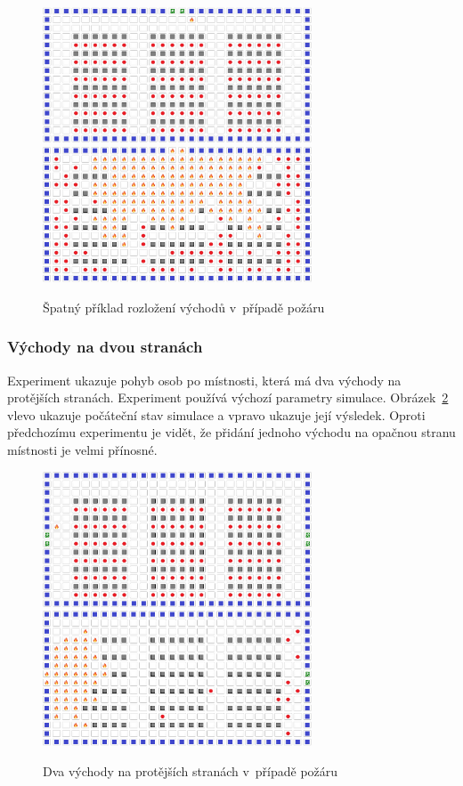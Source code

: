\documentclass[11pt, titlepage, a4paper]{article}
\begin{document}
        \begin{figure}[H]
            \includegraphics[width=8cm]{FireResearch/badFireInit}
            \includegraphics[width=8cm]{FireResearch/badFireEnd}
            \caption{Špatný příklad rozložení východů v~případě požáru}
            \label{badFire}
        \end{figure}

        \subsubsection{Východy na dvou stranách}
        Experiment ukazuje pohyb osob po místnosti, která má dva východy na protějších stranách. Experiment používá výchozí parametry simulace. Obrázek~\ref{goodFire} vlevo ukazuje počáteční stav simulace a vpravo ukazuje její výsledek. Oproti předchozímu experimentu je vidět, že přidání jednoho východu na opačnou stranu místnosti je velmi přínosné.\\

        \begin{figure}[H]
            \includegraphics[width=8cm]{FireResearch/goodFireInit}
            \includegraphics[width=8cm]{FireResearch/goodFireEnd}
            \caption{Dva východy na protějších stranách v~případě požáru}
            \label{goodFire}
        \end{figure}
\end{document}
